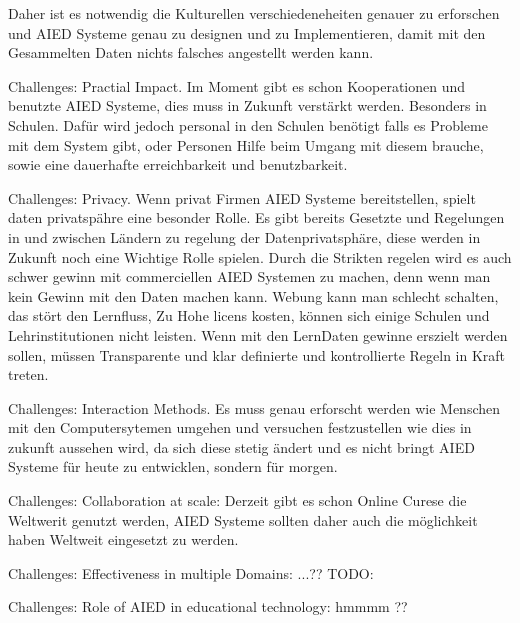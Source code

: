  Daher ist es notwendig die Kulturellen verschiedeneheiten genauer zu erforschen und AIED Systeme genau zu designen und zu Implementieren, damit mit den Gesammelten Daten nichts falsches angestellt werden kann.

 Challenges: Practial Impact. Im Moment gibt es schon Kooperationen und benutzte AIED Systeme, dies muss in Zukunft verstärkt werden. Besonders in Schulen. Dafür wird jedoch personal in den Schulen benötigt
 falls es Probleme mit dem System gibt, oder Personen Hilfe beim Umgang mit diesem brauche, sowie eine dauerhafte erreichbarkeit und benutzbarkeit.


 Challenges: Privacy. Wenn privat Firmen AIED Systeme bereitstellen, spielt daten privatspähre eine besonder Rolle. Es gibt bereits Gesetzte und Regelungen in und zwischen Ländern zu regelung der Datenprivatsphäre, diese 
 werden in Zukunft noch eine Wichtige Rolle spielen. Durch die Strikten regelen wird es auch schwer gewinn mit commerciellen AIED Systemen zu machen, denn wenn man kein Gewinn mit den Daten machen kann. Webung kann man schlecht schalten, das stört den Lernfluss,
 Zu Hohe licens kosten, können sich einige Schulen und Lehrinstitutionen nicht leisten. Wenn mit den LernDaten gewinne erszielt werden sollen, müssen Transparente und klar definierte und kontrollierte Regeln in Kraft treten.


 Challenges: Interaction Methods. Es muss genau erforscht werden wie Menschen mit den Computersytemen umgehen und versuchen festzustellen wie dies in zukunft aussehen wird, da sich diese stetig ändert und es nicht bringt
 AIED Systeme für heute zu entwicklen, sondern für morgen.


 Challenges: Collaboration at scale: Derzeit gibt es schon Online Curese die Weltwerit genutzt werden, AIED Systeme sollten daher auch die möglichkeit haben Weltweit eingesetzt zu werden.

 Challenges: Effectiveness in multiple Domains: ...?? TODO:


 Challenges: Role of AIED in educational technology: hmmmm ??
